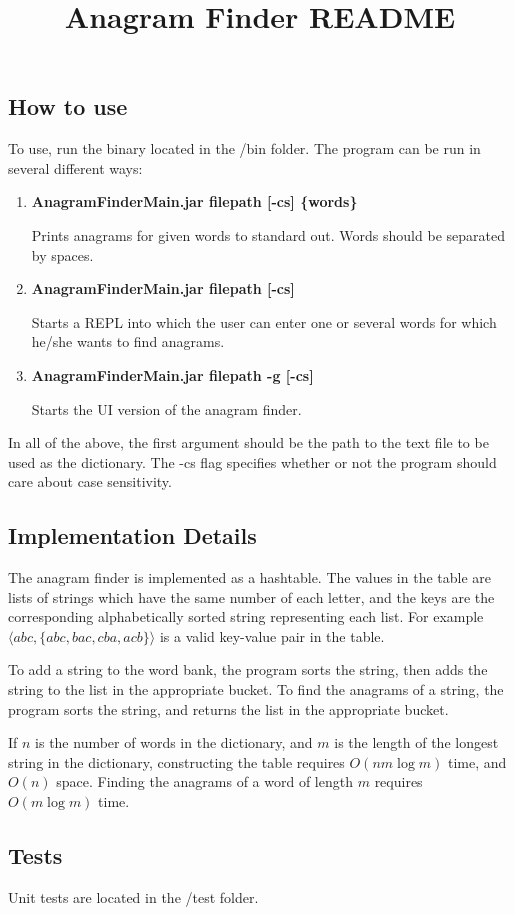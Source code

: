 \documentclass[12pt,letterpaper]{article}
\begin{document}
\title{\vspace{-2cm}Anagram Finder README\vspace{-1cm}}
\date{}
\maketitle
\subsection*{How to use}
To use, run the binary located in the /bin folder. The program can be run in several different ways:
\begin{enumerate}
\item {\bf AnagramFinderMain.jar filepath [-cs] \{words\}}

Prints anagrams for given words to standard out. Words should be separated by spaces.

\item {\bf AnagramFinderMain.jar filepath [-cs]}

Starts a REPL into which the user can enter one or several words for which he/she wants to find anagrams.

\item {\bf AnagramFinderMain.jar filepath -g [-cs]}

Starts the UI version of the anagram finder.
\end{enumerate}

In all of the above, the first argument should be the path to the text file to be used as the dictionary. The -cs flag specifies whether or not the program should care about case sensitivity.
\subsection*{Implementation Details}
The anagram finder is implemented as a hashtable. The values in the table are lists of strings which have the same number of each letter, and the keys are the corresponding alphabetically sorted string representing each list. For example $\langle abc, \{abc, bac, cba, acb\} \rangle$ is a valid key-value pair in the table.

To add a string to the word bank, the program sorts the string, then adds the string to the list in the appropriate bucket. To find the anagrams of a string, the program sorts the string, and returns the list in the appropriate bucket.

If $n$ is the number of words in the dictionary, and $m$ is the length of the longest string in the dictionary, constructing the table requires $O(nm \log m)$ time, and $O(n)$ space. Finding the anagrams of a word of length $m$ requires $O(m \log m)$ time.

\subsection*{Tests}
Unit tests are located in the /test folder.
\end{document}
